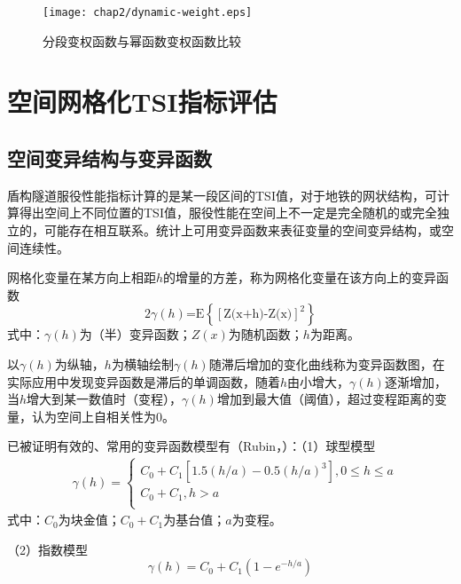 \begin{figure}[htbp]
    \centering
    \texttt{[image: chap2/dynamic-weight.eps]}
    \caption{分段变权函数与幂函数变权函数比较}
    \label{fig:分段变权函数与幂函数变权函数比较}
\end{figure}

\section{空间网格化TSI指标评估}

\subsection{空间变异结构与变异函数}

盾构隧道服役性能指标计算的是某一段区间的TSI值，对于地铁的网状结构，可计算得出空间上不同位置的TSI值，服役性能在空间上不一定是完全随机的或完全独立的，可能存在相互联系。统计上可用变异函数来表征变量的空间变异结构，或空间连续性。

网格化变量在某方向上相距$h$的增量的方差，称为网格化变量在该方向上的变异函数
\begin{equation}
    2\gamma (h)\text{=E}\left\{ {{\left[ \text{Z(x+h)-Z(x)} \right]}^{2}} \right\}
\end{equation}
式中：$\gamma (h)$为（半）变异函数；$Z(x)$为随机函数；$h$为距离。

以$\gamma (h)$为纵轴，$h$为横轴绘制$\gamma (h)$随滞后增加的变化曲线称为变异函数图，在实际应用中发现变异函数是滞后的单调函数，随着$h$由小增大，$\gamma (h)$逐渐增加，当$h$增大到某一数值时（变程），$\gamma (h)$增加到最大值（阈值），超过变程距离的变量，认为空间上自相关性为0。

已被证明有效的、常用的变异函数模型有（Rubin，\citeyear{rubin2003applied}）：（1）球型模型
\begin{align}
& \gamma (h)=\left\{ \begin{array}{*{35}{l}}
   {{C}_{0}}+{{C}_{1}}\left[ 1.5(h/a)-0.5{{(h/a)}^{3}} \right],0\le h\le a  \\
   {{C}_{0}}+{{C}_{1}},h>a  \\
\end{array} \right.
\end{align}
式中：$C_0$为块金值；$C_0+C_1$为基台值；$a$为变程。

（2）指数模型
\begin{equation}
    \gamma (h)={{C}_{0}}+{{C}_{1}}(1-{{e}^{-h/a}})
\end{equation}

